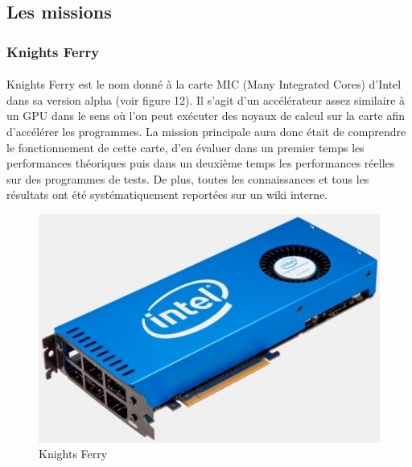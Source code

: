 \documentclass{article}
\begin{document}
		\subsection{Les missions}
			\subsubsection{Knights Ferry}
				\paragraph{}
				Knights Ferry est le nom donné à la carte MIC (Many Integrated Cores) d'Intel dans sa version alpha (voir figure 12). Il s'agit 
				d'un accélérateur assez similaire à un GPU dans le sens où l'on peut exécuter des noyaux de calcul sur la 
				carte afin d'accélérer les programmes. La mission principale aura donc était de comprendre le fonctionnement de cette
				carte, d'en évaluer dans un premier temps les performances théoriques puis dans un deuxième temps les 
				performances réelles sur des programmes de tests. De plus, toutes les connaissances et tous les résultats ont 
				été systématiquement reportées sur un wiki interne.
				\begin{figure}
				\begin{center}
				\includegraphics[scale=0.75]{IntelMIC.jpg}
				\caption{Knights Ferry}
				\end{center}
				\end{figure}
\end{document}
